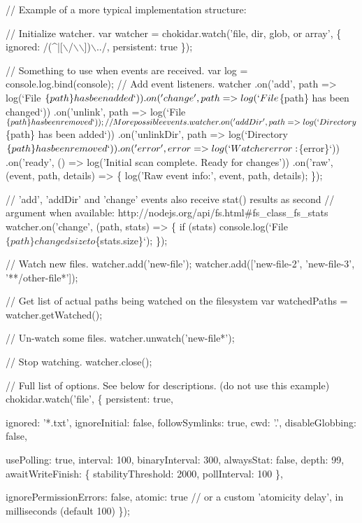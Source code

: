 \begin{DoxyCode}
// Example of a more typical implementation structure:

// Initialize watcher.
var watcher = chokidar.watch('file, dir, glob, or array', \{
  ignored: /(^|[\(\backslash\)/\(\backslash\)\(\backslash\)])\(\backslash\)../,
  persistent: true
\});

// Something to use when events are received.
var log = console.log.bind(console);
// Add event listeners.
watcher
  .on('add', path => log(`File $\{path\} has been added`))
  .on('change', path => log(`File $\{path\} has been changed`))
  .on('unlink', path => log(`File $\{path\} has been removed`));

// More possible events.
watcher
  .on('addDir', path => log(`Directory $\{path\} has been added`))
  .on('unlinkDir', path => log(`Directory $\{path\} has been removed`))
  .on('error', error => log(`Watcher error: $\{error\}`))
  .on('ready', () => log('Initial scan complete. Ready for changes'))
  .on('raw', (event, path, details) => \{
    log('Raw event info:', event, path, details);
  \});

// 'add', 'addDir' and 'change' events also receive stat() results as second
// argument when available: http://nodejs.org/api/fs.html#fs\_class\_fs\_stats
watcher.on('change', (path, stats) => \{
  if (stats) console.log(`File $\{path\} changed size to $\{stats.size\}`);
\});

// Watch new files.
watcher.add('new-file');
watcher.add(['new-file-2', 'new-file-3', '**/other-file*']);

// Get list of actual paths being watched on the filesystem
var watchedPaths = watcher.getWatched();

// Un-watch some files.
watcher.unwatch('new-file*');

// Stop watching.
watcher.close();

// Full list of options. See below for descriptions. (do not use this example)
chokidar.watch('file', \{
  persistent: true,

  ignored: '*.txt',
  ignoreInitial: false,
  followSymlinks: true,
  cwd: '.',
  disableGlobbing: false,

  usePolling: true,
  interval: 100,
  binaryInterval: 300,
  alwaysStat: false,
  depth: 99,
  awaitWriteFinish: \{
    stabilityThreshold: 2000,
    pollInterval: 100
  \},

  ignorePermissionErrors: false,
  atomic: true // or a custom 'atomicity delay', in milliseconds (default 100)
\});
\end{DoxyCode}


